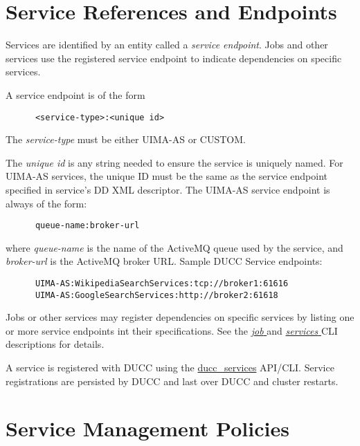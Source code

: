       \section{Service References and Endpoints} 
      \label{sec:service.endpoints}
      Services are identified by an entity called a {\em service endpoint}.  Jobs and other
      services use the registered service endpoint to indicate dependencies on specific
      services.

      A service endpoint is of the form 
\begin{verbatim}
      <service-type>:<unique id>
\end{verbatim}
      
      The {\em service-type} must be either UIMA-AS or CUSTOM.
      
      The {\em unique id} is any string needed to ensure the service is
      uniquely named.  For UIMA-AS services, the unique ID must be the same as the
      service endpoint specified in service's DD XML descriptor.  The UIMA-AS
      service endpoint is always of the form:
\begin{verbatim}
      queue-name:broker-url
\end{verbatim}
      where {\em queue-name} is the name of the ActiveMQ queue used by the service, and {\em broker-url}
      is the ActiveMQ broker URL.  Sample DUCC Service endpoints: 
\begin{verbatim}
      UIMA-AS:WikipediaSearchServices:tcp://broker1:61616
      UIMA-AS:GoogleSearchServices:http://broker2:61618
\end{verbatim}

      Jobs or other services may register dependencies on specific services by listing one or more
      service endpoints int their specifications. See the 
      \hyperref[sec:cli.ducc-submit]{\em job } and 
      \hyperref[sec:cli.ducc-services]{\em services } CLI descriptions for details.
                       
      A service is registered with DUCC using the \hyperref[sec:cli.ducc-services]{ducc\_services}
      API/CLI. Service registrations are persisted by DUCC and last over DUCC and cluster restarts.

      \section{Service Management Policies}
      \label{sec:service.management-policy}

